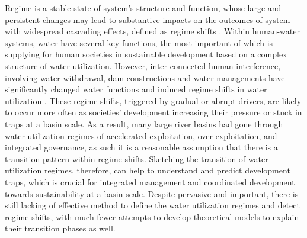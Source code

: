 \documentclass[9pt, twocolumn, twoside, lineno]{pnas-new}
\begin{document}
Regime is a stable state of system’s structure and function, whose large and persistent changes may lead to substantive impacts on the outcomes of system with widespread cascading effects, defined as regime shifts \cite{rochaCascadingRegimeShifts2018a}.
Within human-water systems, water have several key functions, the most important of which is supplying for human societies in sustainable development based on a complex structure of water utilization. 
However, inter-connected human interference, involving water withdrawal, dam constructions and water managements have significantly changed water functions and induced regime shifts in water utilization
\cite{falkenmarkUnderstandingWaterResilience2019}.
These regime shifts, triggered by gradual or abrupt drivers, are likely to occur more often as societies' development increasing their pressure or stuck in traps at a basin scale.
As a result, many large river basins had gone through water utilization regimes of accelerated exploitation, over-exploitation, and integrated governance, as such it is a reasonable assumption that there is a transition pattern within regime shifts. 
Sketching the transition of water utilization regimes, therefore, can help to understand and predict development traps, which is crucial for integrated management and coordinated development towards sustainability at a basin scale.
Despite pervasive and important, there is still lacking of effective method to define the water utilization regimes and detect regime shifts, with much fewer attempts to develop theoretical models to explain their transition phases as well. 
\end{document}
